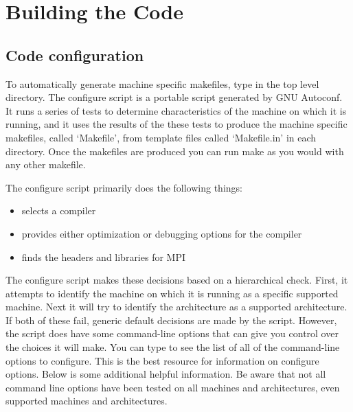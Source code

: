 \chapter{Building the Code}
\section{Code configuration}

To automatically generate machine specific makefiles, type
 in the top level directory.  The configure
script is a portable script generated by GNU Autoconf.  It runs a
series of tests to determine characteristics of the machine on which
it is running, and it uses the results of the these tests to produce
the machine specific makefiles, called `Makefile', from template files
called `Makefile.in' in each directory.  Once the makefiles are
produced you can run make as you would with any other makefile.

The configure script primarily does the following things:
\begin{itemize}
\item selects a compiler
\item provides either optimization or debugging options for the compiler
\item finds the headers and libraries for MPI
\end{itemize}

The configure script makes these decisions based on a hierarchical
check.  First, it attempts to identify the machine on which it is
running as a specific supported machine.  Next it will try to identify
the architecture as a supported architecture.  If both of these fail,
generic default decisions are made by the script.  However, the script
does have some command-line options that can give you control over the
choices it will make.  You can type  to see the
list of all of the command-line options to configure. This is the best
resource for information on configure options.  Below is some
additional helpful information.  Be aware that not all command line
options have been tested on all machines and architectures, even
supported machines and architectures.


